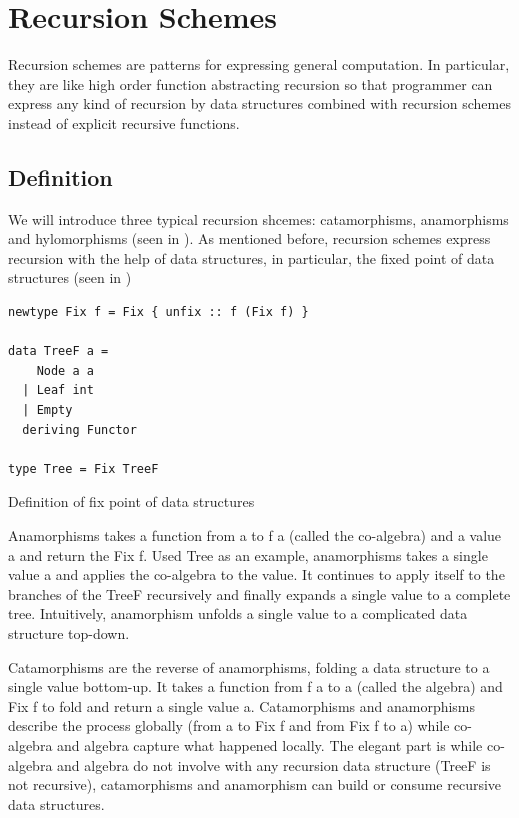\section{Recursion Schemes} \label{b:rs}
Recursion schemes are patterns for expressing general computation. In particular, they are like high order function abstracting recursion so that programmer can express any kind of recursion by data structures combined with recursion schemes instead of explicit recursive functions.
\subsection{Definition}
We will introduce three typical recursion shcemes: catamorphisms, anamorphisms and hylomorphisms (seen in ). As mentioned before, recursion schemes express recursion with the help of data structures, in particular, the fixed point of data structures (seen in )
\begin{code}
\begin{verbatim}
newtype Fix f = Fix { unfix :: f (Fix f) }

data TreeF a =
    Node a a
  | Leaf int
  | Empty
  deriving Functor

type Tree = Fix TreeF
\end{verbatim}
\caption{Definition of fix point of data structures} \label{p:pal:c2}
\end{code}

Anamorphisms takes a function from a to f a (called the co-algebra) and a value a and return the Fix f. Used Tree as an example, anamorphisms takes a single value a and applies the co-algebra to the value. It continues to apply itself to the branches of the TreeF recursively and finally expands a single value to a complete tree. Intuitively, anamorphism unfolds a single value to a complicated data structure top-down.

Catamorphisms are the reverse of anamorphisms, folding a data structure to a single value bottom-up. It takes a function from f a to a (called the algebra) and Fix f to fold and return a single value a. Catamorphisms and anamorphisms describe the process globally (from a to Fix f and from Fix f to a) while co-algebra and algebra capture what happened locally. The elegant part is while co-algebra and algebra do not involve with any recursion data structure (TreeF is not recursive), catamorphisms and anamorphism can build or consume recursive data structures.

